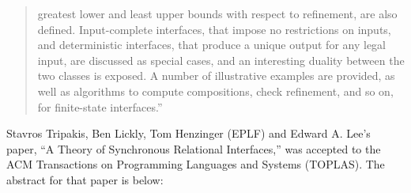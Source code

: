 \begin{quotation}
                 greatest lower and least upper bounds with respect to
                 refinement, are also defined. Input-complete
                 interfaces, that impose no restrictions on inputs, and
                 deterministic interfaces, that produce a unique output
                 for any legal input, are discussed as special cases,
                 and an interesting duality between the two classes is
                 exposed. A number of illustrative examples are
                 provided, as well as algorithms to compute
                 compositions, check refinement, and so on, for
                 finite-state interfaces.''
               \end{quotation}


               Stavros Tripakis, Ben Lickly, Tom Henzinger (EPLF) and Edward A. Lee's
               paper, ``A Theory of Synchronous Relational Interfaces,''\cite{TripakisLicklyHenzingerLee10_TheoryOfSynchronousRelationalInterfaces} was accepted to the ACM Transactions on Programming Languages and Systems (TOPLAS).  The abstract for that paper is below:

